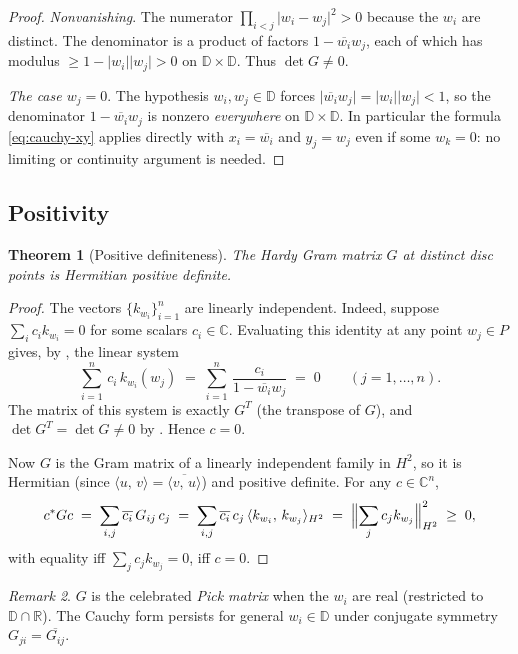 \documentclass[12pt]{article}
\newtheorem{theorem}{Theorem}[section]
\theoremstyle{definition}
\theoremstyle{remark}
\newtheorem{remark}[theorem]{Remark}
\newcommand{\C}{\mathbb{C}}
\newcommand{\R}{\mathbb{R}}
\newcommand{\D}{\mathbb{D}}
\newcommand{\HHH}{H^{2}}
\newcommand{\inner}[2]{\langle #1,\,#2\rangle}
\newcommand{\abs}[1]{\lvert #1 \rvert}
\newcommand{\conj}[1]{\overline{#1}}
\begin{document}
\begin{proof}
\emph{Nonvanishing}. The numerator
$\prod_{i<j}\abs{w_{i}-w_{j}}^{2}>0$ because the $w_{i}$ are distinct.
The denominator is a product of factors $1-\conj{w_{i}}w_{j}$, each of
which has modulus $\ge1-\abs{w_{i}}\abs{w_{j}}>0$ on $\D\times\D$. Thus
$\det G\neq0$.

\emph{The case $w_{j}=0$}. The hypothesis $w_{i},w_{j}\in\D$ forces
$\abs{\conj{w_{i}}w_{j}}=\abs{w_{i}}\abs{w_{j}}<1$, so the denominator
$1-\conj{w_{i}}w_{j}$ is nonzero \emph{everywhere} on $\D\times\D$.
In particular the formula \eqref{eq:cauchy-xy} applies directly with
$x_{i}=\conj{w_{i}}$ and $y_{j}=w_{j}$ even if some $w_{k}=0$: no
limiting or continuity argument is needed.
\end{proof}

\subsection{Positivity}

\begin{theorem}[Positive definiteness]\label{thm:gram-pos-def}
The Hardy Gram matrix $G$ at distinct disc points is Hermitian positive
definite.
\end{theorem}

\begin{proof}
The vectors $\{k_{w_{i}}\}_{i=1}^{n}$ are linearly independent. Indeed,
suppose $\sum_{i}c_{i}k_{w_{i}}=0$ for some scalars $c_{i}\in\C$.
Evaluating this identity at any point $w_{j}\in P$ gives, by
, the linear system
\[
  \sum_{i=1}^{n}\,c_{i}\,k_{w_{i}}(w_{j})\;=\;\sum_{i=1}^{n}\,\frac{c_{i}}{1-\conj{w_{i}}w_{j}}\;=\;0\qquad(j=1,\dots,n).
\]
The matrix of this system is exactly $G^{T}$ (the transpose of $G$), and
$\det G^{T}=\det G\neq0$ by . Hence $c=0$.

Now $G$ is the Gram matrix of a linearly independent family in $\HHH$,
so it is Hermitian (since $\inner{u}{v}=\conj{\inner{v}{u}}$) and positive
definite. For any $c\in\C^{n}$,
\[
  c^{*}Gc\;=\;\sum_{i,j}\conj{c_{i}}\,G_{ij}\,c_{j}
        \;=\;\sum_{i,j}\conj{c_{i}}\,c_{j}\,\inner{k_{w_{i}}}{k_{w_{j}}}_{\HHH}
        \;=\;\Bigl\lVert\sum_{j}c_{j}k_{w_{j}}\Bigr\rVert_{\HHH}^{2}\;\ge\;0,
\]
with equality iff $\sum_{j}c_{j}k_{w_{j}}=0$, iff $c=0$.
\end{proof}

\begin{remark}\label{rem:pick}
$G$ is the celebrated \emph{Pick matrix} when the $w_{i}$ are real
(restricted to $\D\cap\R$). The Cauchy form persists for general
$w_{i}\in\D$ under conjugate symmetry $G_{ji}=\conj{G_{ij}}$.
\end{remark}
\end{document}
